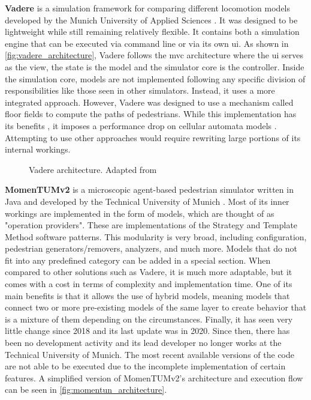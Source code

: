 \documentclass[twoside, 11pt]{article}
\begin{document}
\textbf{Vadere} is a simulation framework for comparing different locomotion models developed by the Munich University of Applied Sciences \cite{kleinmeierVadereOpenSourceSimulation2019}. It was designed to be lightweight while still remaining relatively flexible. It contains both a simulation engine that can be executed via command line or via its own \gls{ui}. As shown in \autoref{fig:vadere_architecture}, Vadere follows the \gls{mvc} architecture where the \gls{ui} serves as the view, the state is the model and the simulator core is the controller. Inside the simulation core, models are not implemented following any specific division of responsibilities like those seen in other simulators. Instead, it uses a more integrated approach. However, Vadere was designed to use a mechanism called floor fields to compute the paths of pedestrians. While this implementation has its benefits \cite{seitzSuperpositionPrincipleConceptual2016}, it imposes a performance drop on cellular automata models \cite{kleinmeierVadereOpenSourceSimulation2019}. Attempting to use other approaches would require rewriting large portions of its internal workings.

\begin{figure}[h]
  \centering
  
  \caption[Vadere architecture]{Vadere architecture. Adapted from \cite{seitzSuperpositionPrincipleConceptual2016}}
  \label{fig:vadere_architecture}
\end{figure}

\textbf{MomenTUMv2} is a microscopic agent-based pedestrian simulator written in Java and developed by the Technical University of Munich \cite{kielarMomenTUMv2ModularExtensible2016}. Most of its inner workings are implemented in the form of models, which are thought of as "operation providers". These are implementations of the Strategy and Template Method software patterns. This modularity is very broad, including configuration, pedestrian generators/removers, analyzers, and much more. Models that do not fit into any predefined category can be added in a special section. When compared to other solutions such as Vadere, it is much more adaptable, but it comes with a cost in terms of complexity and implementation time. One of its main benefits is that it allows the use of hybrid models, meaning models that connect two or more pre-existing models of the same layer to create behavior that is a mixture of them depending on the circumstances. Finally, it has seen very little change since 2018 and its last update was in 2020. Since then, there has been no development activity and its lead developer no longer works at the Technical University of Munich. The most recent available versions of the code are not able to be executed due to the incomplete implementation of certain features. A simplified version of MomenTUMv2's architecture and execution flow can be seen in \autoref{fig:momentun_architecture}.
\end{document}
